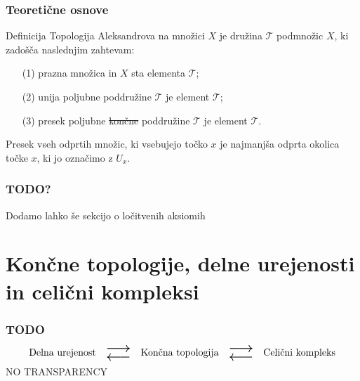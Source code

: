 \documentclass{beamer}
\begin{document}
\begin{frame}[t]
\frametitle{Teoretične osnove}
\begin{block}{Definicija}
    \alert{Topologija Aleksandrova} na množici $X$ je družina $\mathcal{T}$ podmnožic
    $X$, ki zadošča naslednjim zahtevam:
    \begin{itemize}
        \item[(1)] prazna množica in $X$ sta elementa $\mathcal{T}$;
        \item[(2)] unija poljubne poddružine $\mathcal{T}$ je element $\mathcal{T}$;
        \item[(3)] presek poljubne \sout{končne} poddružine $\mathcal{T}$ je element $\mathcal{T}$.
    \end{itemize}
\end{block}
\pause
\vspace{.25cm}
Presek vseh odprtih množic, ki vsebujejo točko $x$ je \alert{najmanjša odprta okolica} točke $x$, ki jo označimo z $U_x$.
\end{frame}

\begin{frame}
    \frametitle{TODO?}
    Dodamo lahko še sekcijo o ločitvenih aksiomih
\end{frame}

\section{Končne topologije, delne urejenosti in celični kompleksi}
\begin{frame}[t] %
    \frametitle{TODO}
    \vspace{-8mm}
    \[
        \text{Delna urejenost}
        \quad
        \raisebox{-3pt}{\scalebox{2}{$\substack{\longleftarrow\\[-1em] \longrightarrow }$}}
        \quad
        \text{Končna topologija}
        \quad
        \raisebox{-3pt}{\scalebox{2}{$\substack{\longleftarrow\\[-1em] \longrightarrow }$}}
        \quad
        \text{Celični kompleks}
    \]
    \vspace{1cm}
    NO TRANSPARENCY
\end{frame}
\end{document}
